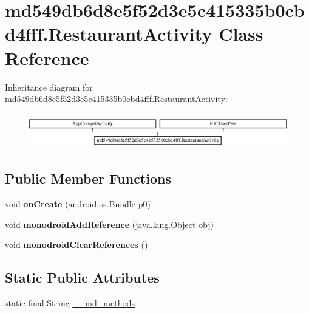 \hypertarget{classmd549db6d8e5f52d3e5c415335b0cbd4fff_1_1_restaurant_activity}{}\section{md549db6d8e5f52d3e5c415335b0cbd4fff.\+Restaurant\+Activity Class Reference}
\label{classmd549db6d8e5f52d3e5c415335b0cbd4fff_1_1_restaurant_activity}
Inheritance diagram for md549db6d8e5f52d3e5c415335b0cbd4fff.\+Restaurant\+Activity\+:\begin{figure}[H]
\begin{center}
\leavevmode
\includegraphics[height=1.551247cm]{classmd549db6d8e5f52d3e5c415335b0cbd4fff_1_1_restaurant_activity}
\end{center}
\end{figure}
\subsection*{Public Member Functions}
\begin{DoxyCompactItemize}
\item 
\mbox{\label{classmd549db6d8e5f52d3e5c415335b0cbd4fff_1_1_restaurant_activity_aada3c7d8558477dfe203d59ea66b85b1}} 
void {\bfseries on\+Create} (android.\+os.\+Bundle p0)
\item 
\mbox{\label{classmd549db6d8e5f52d3e5c415335b0cbd4fff_1_1_restaurant_activity_a5788b7ccaa2a9b56ecbb743712bafbee}} 
void {\bfseries monodroid\+Add\+Reference} (java.\+lang.\+Object obj)
\item 
\mbox{\label{classmd549db6d8e5f52d3e5c415335b0cbd4fff_1_1_restaurant_activity_a41392088b43ce318f71a4ff69b97cefa}} 
void {\bfseries monodroid\+Clear\+References} ()
\end{DoxyCompactItemize}
\subsection*{Static Public Attributes}
\begin{DoxyCompactItemize}
\item 
static final String \hyperlink{classmd549db6d8e5f52d3e5c415335b0cbd4fff_1_1_restaurant_activity_a08dd15ecf61daf10b2eabfbbb22d867d}{\+\_\+\+\_\+md\+\_\+methods}
\end{DoxyCompactItemize}


